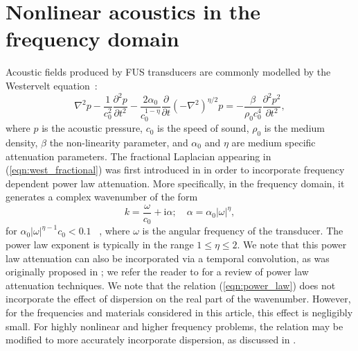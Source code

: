 \documentclass[11pt]{article}
\numberwithin{equation}{section}
\newcommand{\red}[1]{{\color{black} #1}}
\begin{document}
\section{\label{sec:2} Nonlinear acoustics in the frequency domain}
\label{sec:nonlinear_acoustics}
Acoustic fields produced by \red{FUS} transducers are commonly modelled by the 
Westervelt equation~\cite{hamilton1998nonlinear}:
    \begin{equation}
        \nabla^2 p
        - \frac{1}{c_0^2}\frac{\partial^2 p}{\partial t^2} 
        - \frac{2\alpha_0}{c_0^{1-\eta}}\frac{\partial }{\partial t}
        \left( -\nabla^2\right)^{\eta/2}p = 
        -\frac{\beta}{\rho_0 c_0^4}\frac{\partial^2 p^2}{\partial t^2},
        \label{eqn:west_fractional}
    \end{equation}
    where $p$ is the acoustic pressure, $c_0$ is the speed of sound, 
    $\rho_0$ is the medium density, $\beta$ the non-linearity parameter, and 
    $\alpha_0$ and $\eta$ are medium specific attenuation parameters.    
    The fractional Laplacian appearing in (\ref{eqn:west_fractional}) was first 
    introduced in \cite{chen2004fractional} in order to incorporate frequency 
    dependent power law attenuation. More specifically, in the frequency domain, it 
    generates a complex wavenumber of the form
    \begin{equation}
        k = \frac{\omega}{c_0} + \text{i}\alpha;\quad  \alpha=\alpha_0|\omega|^{\eta},
        \label{eqn:power_law}
    \end{equation}
    for $\alpha_0|\omega|^{\eta-1}c_0<0.1$ ~\cite{szabo1994time}, where $\omega$
    is the angular frequency of the transducer.
    The power law exponent is typically in the range 
    $1\leq \eta\leq 2$. We note that this power law attenuation can also be incorporated 
    via a temporal convolution, as was originally proposed in \cite{szabo1994time}; 
    we refer the reader to \cite{treeby2010modeling} for a review of power law 
    attenuation techniques. \red{We note that the relation (\ref{eqn:power_law}) does not 
    incorporate the effect of dispersion on the real part of the wavenumber. However,
    for the frequencies and materials considered in this article, this effect is negligibly
    small. For highly nonlinear and higher frequency problems, the relation may be 
    modified to more accurately incorporate dispersion, as discussed in \cite{treeby2010modeling,waters2005causality}.}
    
\end{document}
